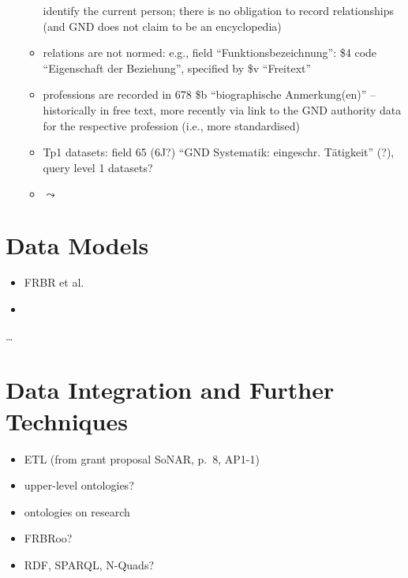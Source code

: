 \begin{itemize}
\begin{itemize}
        identify the current person; there is no obligation to record relationships
        (and GND does not claim to be an encyclopedia)
      \item
        relations are not normed:
        e.g., field \enquote{Funktionsbezeichnung}: \$4 code \enquote{Eigenschaft der Beziehung},
        specified by \$v \enquote{Freitext}
      \item
        professions are recorded in 678 \$b \enquote{biographische Anmerkung(en)} --
        historically in free text,
        more recently via link to the GND authority data for the respective profession (i.e., more standardised)
      \item
        Tp1 datasets: field 65 (6J?) \enquote{GND Systematik: eingeschr. Tätigkeit} (?),
        query level 1 datasets?
      \item
        $\leadsto$ 
    \end{itemize}
\end{itemize}

\section{Data Models}
\label{sec:data_models}

\begin{itemize}
  \item
    FRBR et al.
  \item 
\end{itemize}

\dots

\section{Data Integration and Further Techniques}
\label{sec:data_integration}

\begin{itemize}
  \item 
    ETL (from grant proposal SoNAR, p.~8, AP1-1)
  \item
    upper-level ontologies?
  \item 
    ontologies on research
  \item
    FRBRoo?
  \item
    RDF, SPARQL, N-Quads?
\end{itemize}


